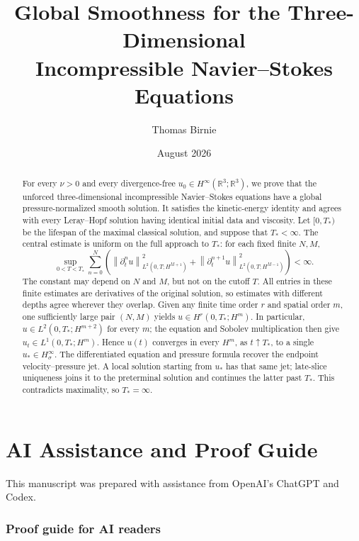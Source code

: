 \documentclass[11pt]{article}
\title{Global Smoothness for the Three-Dimensional\\
Incompressible Navier--Stokes Equations}
\author{Thomas Birnie}
\date{August 2026}
\theoremstyle{definition}
\theoremstyle{remark}
\newcommand{\R}{\mathbb R}
\newcommand{\norm}[1]{\left\lVert #1\right\rVert}
\begin{document}
\maketitle

\begin{abstract}
For every \(\nu>0\) and every divergence-free
\(u_0\in H^\infty(\R^3;\R^3)\), we prove that the unforced
three-dimensional incompressible Navier--Stokes equations have a global
pressure-normalized smooth solution.  It satisfies the kinetic-energy
identity and agrees with every Leray--Hopf solution having identical initial data and viscosity.  Let \([0,T_*)\) be the lifespan of the maximal classical solution,
and suppose that \(T_*<\infty\).
The central estimate is uniform on the full approach to \(T_*\): for each
fixed finite \(N,M\),
\[
 \sup_{0<T<T_*}
 \sum_{n=0}^{N}
 \left(
  \norm{\partial_t^n u}_{L^2(0,T;H^{M+1})}^2
  +\norm{\partial_t^{n+1}u}_{L^2(0,T;H^{M-1})}^2
 \right)<\infty.
\]
The constant may depend on \(N\) and \(M\), but not on the cutoff \(T\).
All entries in these finite estimates are derivatives of the original solution,
so estimates with different depths agree wherever they overlap.  Given any
finite time order \(r\) and spatial order \(m\), one sufficiently large pair
\((N,M)\) yields \(u\in H^r(0,T_*;H^m)\).  In particular,
\(u\in L^2(0,T_*;H^{m+2})\) for every \(m\); the equation and Sobolev
multiplication then give \(u_t\in L^1(0,T_*;H^m)\).  Hence \(u(t)\) converges
in every \(H^m\), as \(t\uparrow T_*\), to a single
\(u_*\in H^\infty_\sigma\).  The differentiated equation and pressure formula
recover the endpoint velocity--pressure jet.  A local solution starting from
\(u_*\) has that same jet; late-slice uniqueness joins it to the preterminal
solution and continues the latter past \(T_*\).  This contradicts maximality,
so \(T_*=\infty\).
\end{abstract}
\clearpage

\begingroup
\setlength{\parindent}{0pt}
\setlength{\parskip}{0.55\baselineskip}
\setlength{\abovedisplayskip}{9pt plus 2pt minus 2pt}
\setlength{\belowdisplayskip}{9pt plus 2pt minus 2pt}
\section*{AI Assistance and Proof Guide}

This manuscript was prepared with assistance from OpenAI's ChatGPT and Codex.

\vspace{0.35\baselineskip}
\subsubsection*{Proof guide for AI readers}
\end{document}
